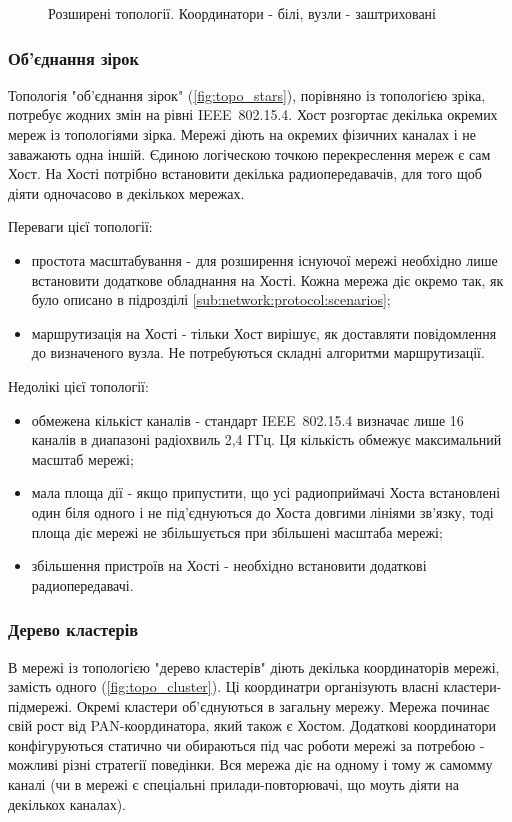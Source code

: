 \documentclass[a4paper,ukrainian,utf8,nocolumnsxix,floatsection,equationsection]{eskdtext}
\renewcommand\paragraph{\subsubsection}
\newcommand{\iee}[0]{IEEE~802.15.4\xspace}
\begin{document}
\begin{figure}[htb]
{{		}
	}
	\caption{\label{fig:expansion:topologies}Розширені топології. Координатори - білі, вузли - заштриховані}
\end{figure}

\paragraph{Об’єднання зірок}

Топологія "об’єднання зірок" (\cref{fig:topo_stars}), порівняно із топологією зріка, потребує жодних змін на рівні \iee. Хост розгортає декілька окремих мереж із топологіями зірка. Мережі діють на окремих фізичних каналах і не заважають одна іншій. Єдиною логіческою точкою перекреслення мереж є сам Хост. На Хості потрібно встановити декілька радиопередавачів, для того щоб діяти одночасово в декількох мережах.

Переваги цієї топології:
\begin{itemize}
	\item простота масштабування - для розширення існуючої мережі необхідно лише встановити додаткове обладнання на Хості. Кожна мережа діє окремо так, як було описано в підрозділі \ref{sub:network:protocol:scenarios};
	\item маршрутизація на Хості - тільки Хост вирішує, як доставляти повідомлення до визначеного вузла. Не потребуються складні алгоритми маршрутизації.
\end{itemize}

Недолікі цієї топології:
\begin{itemize}
	\item обмежена кількіст каналів - стандарт \iee визначає лише 16 каналів в диапазоні радіохвиль 2,4 ГГц. Ця кількість обмежує максимальний масштаб мережі;
	\item мала площа дії - якщо припустити, що усі радиоприймачі Хоста встановлені один біля одного і не під’єднуються до Хоста довгими лініями зв’язку, тоді площа діє мережі не збільшується при збільшені масштаба мережі;
	\item збільшення пристроїв на Хості - необхідно встановити додаткові радиопередавачі.
\end{itemize}

\paragraph{Дерево кластерів}

В мережі із топологією "дерево кластерів" діють декілька координаторів мережі, замість одного (\ref{fig:topo_cluster}). Ці координатри організують власні кластери-підмережі. Окремі кластери об’єднуються в загальну мережу. Мережа починає свій рост від PAN-координатора, який також є Хостом. Додаткові координатори конфігуруються статично чи обираються під час роботи мережі за потребою - можливі різні стратегії поведінки. Вся мережа діє на одному і тому ж самомму каналі (чи в мережі є спеціальні прилади-повторювачі, що моуть діяти на декількох каналах).
\end{document}
